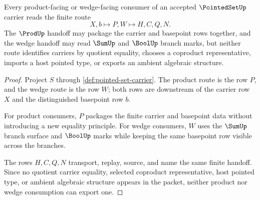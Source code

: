 \begin{theorem}
\label{thm:pointed-set-product-wedge-handoff}
Every product-facing or wedge-facing consumer of an accepted $\PointedSetUp$ carrier reads the finite route
$$
X,b \longmapsto P,W \longmapsto H,C,Q,N .
$$
The $\ProdUp$ handoff may package the carrier and basepoint rows together, and the wedge handoff may read $\SumUp$ and $\BoolUp$ branch marks, but neither route identifies carriers by quotient equality, chooses a coproduct representative, imports a host pointed type, or exports an ambient algebraic structure.
\end{theorem}
\begin{proof}
Project $S$ through \autoref{def:pointed-set-carrier}. The product route is the row $P$, and the wedge route is the row $W$; both rows are downstream of the carrier row $X$ and the distinguished basepoint row $b$.

For product consumers, $P$ packages the finite carrier and basepoint data without introducing a new equality principle. For wedge consumers, $W$ uses the $\SumUp$ branch surface and $\BoolUp$ marks while keeping the same basepoint row visible across the branches.

The rows $H,C,Q,N$ transport, replay, source, and name the same finite handoff. Since no quotient carrier equality, selected coproduct representative, host pointed type, or ambient algebraic structure appears in the packet, neither product nor wedge consumption can export one.
\end{proof}


\begin{closurestatus}{\PointedSetUp}
  \theoryclosure{\seedClosure}
  \formalstatus{\unformalizedV}
\end{closurestatus}
